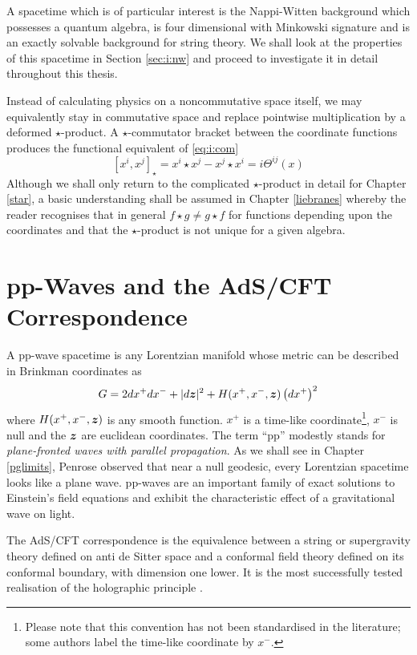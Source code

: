A spacetime which is of particular interest is the Nappi-Witten background
\cite{NW1} which possesses a quantum algebra, is four dimensional with Minkowski
signature and is an exactly solvable background for string theory. We shall look
at the properties of this spacetime in Section \ref{sec:i:nw} and proceed to
investigate it in detail throughout this thesis.

Instead of calculating physics on a noncommutative space itself, we may
equivalently stay in commutative space and replace pointwise multiplication by a
deformed $\star$-product. A $\star$-commutator bracket between the coordinate
functions produces the functional equivalent of \eqref{eq:i:com}
\begin{equation}
  \label{eq:i:starcom}
  [ x^i,  x^j]_\star = x^i\star x^j - x^j\star x^i = i \Theta^{ij}(x)
\end{equation}
Although we shall only return to the complicated $\star$-product in detail for
Chapter \ref{star}, a basic understanding shall be assumed in Chapter
\ref{liebranes} whereby the reader recognises that in general $f\star g \neq
g\star f$ for functions depending upon the coordinates and that the
$\star$-product is not unique for a given algebra.

\section{pp-Waves and the AdS/CFT Correspondence}
A pp-wave spacetime is any Lorentzian manifold whose metric can be described in
Brinkman coordinates \cite{Brink1} as
\begin{equation}
  \label{eq:brinkman}
  G = 2dx^+dx^- + |d{{\boldsymbol {z} }}|^2 + H(x^+, x^-, {{\boldsymbol {z} }})\left( d x^+\right)^2
\end{equation}
where $H(x^+, x^-, {{\boldsymbol {z} }})$ is any smooth function. $x^+$ is a time-like
coordinate\footnote{Please note that this convention has not been standardised
  in the literature; some authors label the time-like coordinate by $x^-$.},
$x^-$ is null and the ${{\boldsymbol {z} }}$ are euclidean coordinates. The term ``pp'' modestly
stands for \textit{plane-fronted waves with parallel propagation}. As we shall
see in Chapter \ref{pglimits}, Penrose \cite{Penrose1} observed that near a null
geodesic, every Lorentzian spacetime looks like a plane wave. pp-waves are an
important family of exact solutions to Einstein's field equations and exhibit
the characteristic effect of a gravitational wave on light.

The AdS/CFT correspondence \cite{Aharony:1999ti} is the equivalence between a
string or supergravity theory defined on anti de Sitter space and a conformal
field theory defined on its conformal boundary, with dimension one lower. It is
the most successfully tested realisation of the holographic principle
\cite{Bousso:2002ju}.

